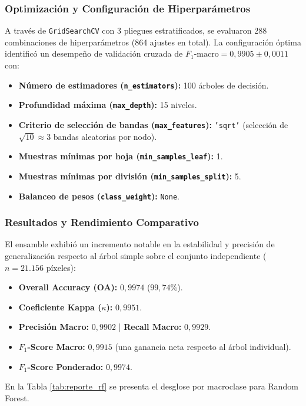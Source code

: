 \documentclass[12pt]{article}
\begin{document}
\subsubsection{Optimización y Configuración de Hiperparámetros}
A través de \texttt{GridSearchCV} con 3 pliegues estratificados, se evaluaron 288 combinaciones de hiperparámetros (864 ajustes en total). La configuración óptima identificó un desempeño de validación cruzada de $F_1\text{-macro} = 0{,}9905 \pm 0{,}0011$ con:
\begin{itemize}
    \item \textbf{Número de estimadores (\texttt{n\_estimators}):} 100 árboles de decisión.
    \item \textbf{Profundidad máxima (\texttt{max\_depth}):} 15 niveles.
    \item \textbf{Criterio de selección de bandas (\texttt{max\_features}):} \texttt{'sqrt'} (selección de $\sqrt{10} \approx 3$ bandas aleatorias por nodo).
    \item \textbf{Muestras mínimas por hoja (\texttt{min\_samples\_leaf}):} 1.
    \item \textbf{Muestras mínimas por división (\texttt{min\_samples\_split}):} 5.
    \item \textbf{Balanceo de pesos (\texttt{class\_weight}):} \texttt{None}.
\end{itemize}

\subsubsection{Resultados y Rendimiento Comparativo}
El ensamble exhibió un incremento notable en la estabilidad y precisión de generalización respecto al árbol simple sobre el conjunto independiente ($n = 21.156$ píxeles):
\begin{itemize}
    \item \textbf{Overall Accuracy (OA):} $0{,}9974$ ($99{,}74\%$).
    \item \textbf{Coeficiente Kappa ($\kappa$):} $0{,}9951$.
    \item \textbf{Precisión Macro:} $0{,}9902$ | \textbf{Recall Macro:} $0{,}9929$.
    \item \textbf{$F_1$-Score Macro:} $0{,}9915$ (una ganancia neta respecto al árbol individual).
    \item \textbf{$F_1$-Score Ponderado:} $0{,}9974$.
\end{itemize}

En la Tabla \ref{tab:reporte_rf} se presenta el desglose por macroclase para Random Forest.
\end{document}
